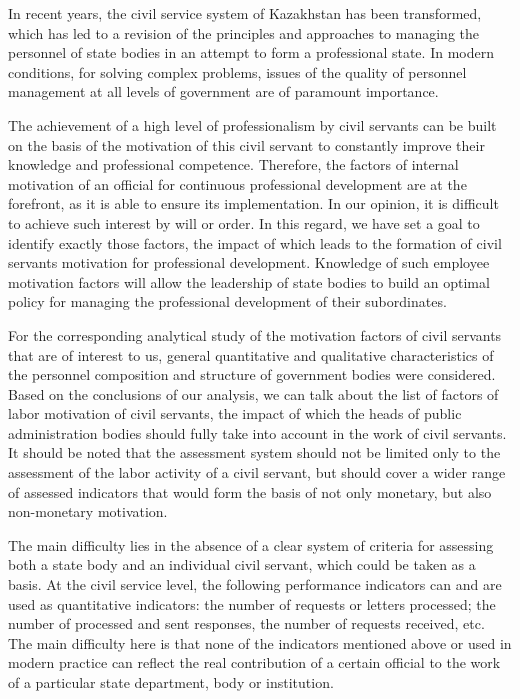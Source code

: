 \begin{multicols}{2}
In recent years, the civil service system of Kazakhstan has been
transformed, which has led to a revision of the principles and
approaches to managing the personnel of state bodies in an attempt to
form a professional state. In modern conditions, for solving complex
problems, issues of the quality of personnel management at all levels of
government are of paramount importance.

The achievement of a high level of professionalism by civil servants can
be built on the basis of the motivation of this civil servant to
constantly improve their knowledge and professional competence.
Therefore, the factors of internal motivation of an official for
continuous professional development are at the forefront, as it is able
to ensure its implementation. In our opinion, it is difficult to achieve
such interest by will or order. In this regard, we have set a goal to
identify exactly those factors, the impact of which leads to the
formation of civil servants\textquotesingle{} motivation for
professional development. Knowledge of such employee motivation factors
will allow the leadership of state bodies to build an optimal policy for
managing the professional development of their subordinates.

For the corresponding analytical study of the motivation factors of
civil servants that are of interest to us, general quantitative and
qualitative characteristics of the personnel composition and structure
of government bodies were considered. Based on the conclusions of our
analysis, we can talk about the list of factors of labor motivation of
civil servants, the impact of which the heads of public administration
bodies should fully take into account in the work of civil servants. It
should be noted that the assessment system should not be limited only to
the assessment of the labor activity of a civil servant, but should
cover a wider range of assessed indicators that would form the basis of
not only monetary, but also non-monetary motivation.

The main difficulty lies in the absence of a clear system of criteria
for assessing both a state body and an individual civil servant, which
could be taken as a basis. At the civil service level, the following
performance indicators can and are used as quantitative indicators: the
number of requests or letters processed; the number of processed and
sent responses, the number of requests received, etc. The main
difficulty here is that none of the indicators mentioned above or used
in modern practice can reflect the real contribution of a certain
official to the work of a particular state department, body or
institution.


\end{multicols}
